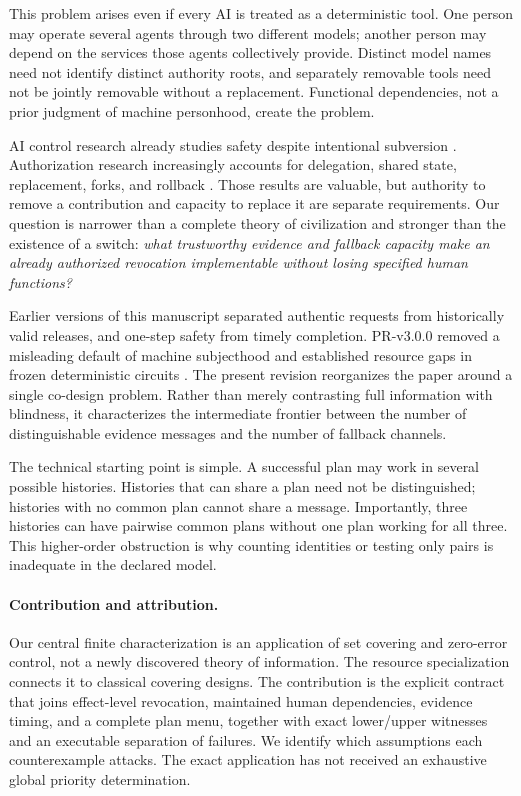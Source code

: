 \documentclass[11pt,a4paper]{article}
\theoremstyle{definition}\newtheorem{definition}{Definition}
\begin{document}
This problem arises even if every AI is treated as a deterministic tool. One person may operate several agents through two different models; another person may depend on the services those agents collectively provide. Distinct model names need not identify distinct authority roots, and separately removable tools need not be jointly removable without a replacement. Functional dependencies, not a prior judgment of machine personhood, create the problem.

AI control research already studies safety despite intentional subversion \cite{greenblatt}. Authorization research increasingly accounts for delegation, shared state, replacement, forks, and rollback \cite{muruaga,zhu}. Those results are valuable, but authority to remove a contribution and capacity to replace it are separate requirements. Our question is narrower than a complete theory of civilization and stronger than the existence of a switch: \emph{what trustworthy evidence and fallback capacity make an already authorized revocation implementable without losing specified human functions?}

Earlier versions of this manuscript separated authentic requests from historically valid releases, and one-step safety from timely completion. PR-v3.0.0 removed a misleading default of machine subjecthood and established resource gaps in frozen deterministic circuits \cite{liu3}. The present revision reorganizes the paper around a single co-design problem. Rather than merely contrasting full information with blindness, it characterizes the intermediate frontier between the number of distinguishable evidence messages and the number of fallback channels.

The technical starting point is simple. A successful plan may work in several possible histories. Histories that can share a plan need not be distinguished; histories with no common plan cannot share a message. Importantly, three histories can have pairwise common plans without one plan working for all three. This higher-order obstruction is why counting identities or testing only pairs is inadequate in the declared model.

\paragraph{Contribution and attribution.}
Our central finite characterization is an application of set covering and zero-error control, not a newly discovered theory of information. The resource specialization connects it to classical covering designs. The contribution is the explicit contract that joins effect-level revocation, maintained human dependencies, evidence timing, and a complete plan menu, together with exact lower/upper witnesses and an executable separation of failures. We identify which assumptions each counterexample attacks. The exact application has not received an exhaustive global priority determination.
\end{document}
